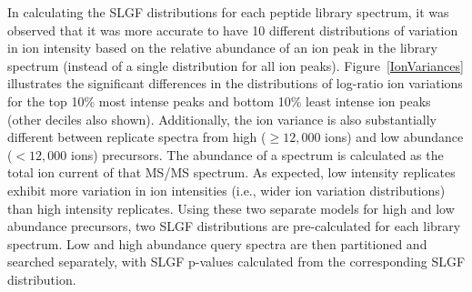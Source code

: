 \documentclass[endnotes,11pt]{article}
\begin{document}
In calculating the SLGF distributions for each peptide library spectrum, it was observed that it was more accurate to have 10 different distributions of variation in ion intensity based on the relative abundance of an ion peak in the library spectrum (instead of a single distribution for all ion peaks). Figure~\ref{IonVariances} illustrates the significant differences in the distributions of log-ratio ion variations for the top 10\% most intense peaks and bottom 10\% least intense ion peaks (other deciles also shown). Additionally, the ion variance is also substantially different between replicate spectra from high ($\geq 12,000 $ ions) and low abundance ($<12,000 $ ions) precursors. The abundance of a spectrum is calculated as the total ion current of that MS/MS spectrum. As expected, low intensity replicates exhibit more variation in ion intensities (i.e., wider ion variation distributions) than high intensity replicates. Using these two separate models for high and low abundance precursors, two SLGF distributions are pre-calculated for each library spectrum. Low and high abundance query spectra are then partitioned and searched separately, with SLGF p-values calculated from the corresponding SLGF distribution.
\end{document}
